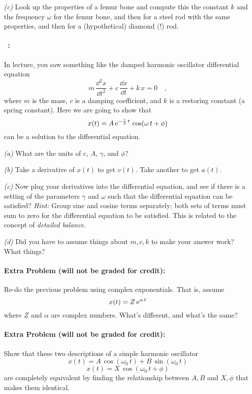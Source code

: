 \documentclass[12pt]{article}
\begin{document}
\textsl{(c)} Look up the properties of a femur bone and compute this
the constant $k$ and the frequency $\omega$ for the femur bone, and
then for a steel rod with the same properties, and then for a
(hypothetical) diamond (!) rod.

\paragraph{\problemname~\theproblem:}%
In lecture, you saw something like the damped harmonic oscillator
differential equation
\begin{equation}
m\,\frac{\dd^2 x}{\dd t^2} + c\,\frac{\dd x}{\dd t} + k\,x = 0 \quad ,
\end{equation}
where $m$ is the mass, $c$ is a damping coefficient, and $k$ is a
restoring constant (a spring constant).  Here we are going to show
that
\begin{equation}
x(t) = A\,\mathrm{e}^{-\frac{\gamma}{2}\,t}\,\cos (\omega\,t + \phi)
\end{equation}
can be a solution to the differential equation.

\textsl{(a)} What are the units of $c$, $A$, $\gamma$, and $\phi$?

\textsl{(b)} Take a derivative of $x(t)$ to get $v(t)$. Take another
to get $a(t)$.

\textsl{(c)} Now plug your derivatives into the differential equation,
and see if there is a setting of the parameters $\gamma$ and $\omega$
such that the differential equation can be satisfied? \emph{Hint:}
Group sine and cosine terms separately; both sets of terms must sum to
zero for the differential equation to be satisfied. This is related to
the concept of \emph{detailed balance}.

\textsl{(d)} Did you have to assume things about $m, c, k$ to make
your answer work? What things?

\paragraph{Extra Problem (will not be graded for credit):}%
Re-do the previous problem using complex exponentials. That is, assume
\begin{equation}
x(t) = Z\,\mathrm{e}^{\alpha\,t}
\end{equation}
where $Z$ and $\alpha$ are complex numbers. What's different, and
what's the same?

\paragraph{Extra Problem (will not be graded for credit):}%
Show that these two descriptions of a simple harmonic oscillator
\begin{equation}
x(t) = A\,\cos(\omega_0\,t) + B\,\sin(\omega_0\,t)
\end{equation}
\begin{equation}
x(t) = X\,\cos (\omega_0\,t+\phi)
\end{equation}
are completely equivalent by finding the relationship between $A, B$
and $X, \phi$ that makes them identical.
\end{document}
